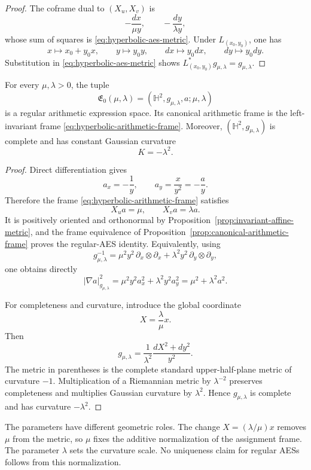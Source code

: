 \begin{proof}
The coframe dual to $(X_u,X_v)$ is
\[
 -\frac{dx}{\mu y},
 \qquad
 -\frac{dy}{\lambda y},
\]
whose sum of squares is \eqref{eq:hyperbolic-aes-metric}.  Under
$L_{(x_0,y_0)}$, one has
\[
 x\longmapsto x_0+y_0x,\qquad
 y\longmapsto y_0y,\qquad
 dx\longmapsto y_0dx,\qquad
 dy\longmapsto y_0dy.
\]
Substitution in \eqref{eq:hyperbolic-aes-metric} shows
$L_{(x_0,y_0)}^*g_{\mu,\lambda}=g_{\mu,\lambda}$.
\end{proof}

\begin{theorem}\label{thm:basic-hyperbolic-aes}
For every $\mu,\lambda>0$, the tuple
\[
 \mathfrak E_0(\mu,\lambda)
 =(\mathbb H^2,g_{\mu,\lambda},a;\mu,\lambda)
\]
is a regular arithmetic expression space.  Its canonical arithmetic frame is
the left-invariant frame \eqref{eq:hyperbolic-arithmetic-frame}.  Moreover,
$(\mathbb H^2,g_{\mu,\lambda})$ is complete and has constant Gaussian
curvature
\[
 K=-\lambda^2.
\]
\end{theorem}

\begin{proof}
Direct differentiation gives
\[
 a_x=-\frac1y,
 \qquad
 a_y=\frac{x}{y^2}=-\frac ay.
\]
Therefore the frame \eqref{eq:hyperbolic-arithmetic-frame} satisfies
\[
 X_u a=\mu,
 \qquad
 X_v a=\lambda a.
\]
It is positively oriented and orthonormal by
Proposition~\ref{prop:invariant-affine-metric}, and the frame equivalence of
Proposition~\ref{prop:canonical-arithmetic-frame} proves the regular-AES
identity.  Equivalently, using
\[
 g_{\mu,\lambda}^{-1}
 =\mu^2y^2\,\partial_x\otimes\partial_x
  +\lambda^2y^2\,\partial_y\otimes\partial_y,
\]
one obtains directly
\[
 |\nabla a|_{g_{\mu,\lambda}}^2
 =\mu^2y^2a_x^2+\lambda^2y^2a_y^2
 =\mu^2+\lambda^2a^2.
\]

For completeness and curvature, introduce the global coordinate
\[
 X=\frac{\lambda}{\mu}x.
\]
Then
\begin{equation}\label{eq:scaled-standard-hyperbolic-metric}
 g_{\mu,\lambda}
 =\frac1{\lambda^2}\frac{dX^2+dy^2}{y^2}.
\end{equation}
The metric in parentheses is the complete standard upper-half-plane metric of
curvature $-1$.  Multiplication of a Riemannian metric by
$\lambda^{-2}$ preserves completeness and multiplies Gaussian curvature by
$\lambda^2$.  Hence $g_{\mu,\lambda}$ is complete and has curvature
$-\lambda^2$.
\end{proof}

The parameters have different geometric roles.  The change
$X=(\lambda/\mu)x$ removes $\mu$ from the metric, so $\mu$ fixes the
additive normalization of the assignment frame.  The parameter $\lambda$
sets the curvature scale.  No uniqueness claim for regular AESs follows from
this normalization.

